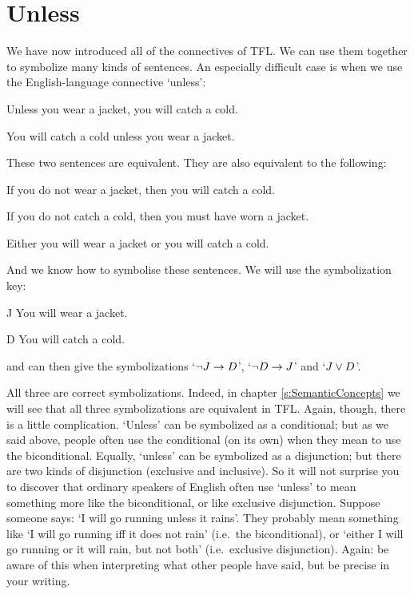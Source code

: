 \section{Unless}
We have now introduced all of the connectives of TFL. We can use them together to symbolize many kinds of sentences. An especially difficult case is when we use the English-language connective `unless':

\begin{earg}
\item[\ex{unless1}] Unless you wear a jacket, you will catch a cold. 
\item[\ex{unless2}] You will catch a cold unless you wear a jacket. 
\end{earg}
These two sentences are equivalent. They are also equivalent to the following: 
\begin{earg}
\item[] If you do not wear a jacket, then you will catch a cold.
\item[] If you do not catch a cold, then you must have worn a jacket.
\item[] Either you will wear a jacket or you will catch a cold.
\end{earg} 
And we know how to symbolise these sentences. We will use the symbolization key:
	\begin{ekey}
		\item[J] You will wear a jacket.
		\item[D] You will catch a cold.
	\end{ekey} and can then give the symbolizations `$\neg J \rightarrow D$', `$\neg D \rightarrow J$' and `$J \vee D$'.

All three are correct symbolizations. Indeed, in chapter \ref{s:SemanticConcepts} we will see that all three symbolizations are equivalent in TFL.
Again, though, there is a little complication. `Unless' can be symbolized as a conditional; but as we said above, people often use the conditional (on its own) when they mean to use the biconditional. Equally, `unless' can be symbolized as a disjunction; but there are two kinds of disjunction (exclusive and inclusive). So it will not surprise you to discover that ordinary speakers of English often use `unless' to mean something more like the biconditional, or like exclusive disjunction. Suppose someone says: `I will go running unless it rains'. They probably mean something like `I will go running iff it does not rain' (i.e.\ the biconditional), or  `either I will go running or it will rain, but not both' (i.e.\ exclusive disjunction). Again: be aware of this when interpreting what other people have said, but be precise in your writing.

